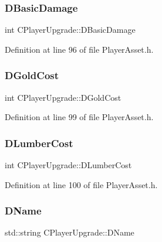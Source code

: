 \subsubsection{\texorpdfstring{D\+Basic\+Damage}{DBasicDamage}}
{\footnotesize\ttfamily int C\+Player\+Upgrade\+::\+D\+Basic\+Damage\hspace{0.3cm}{\ttfamily [protected]}}



Definition at line 96 of file Player\+Asset.\+h.

\hypertarget{classCPlayerUpgrade_ab542fa525d263bf54ee75bddb486471c}{}\label{classCPlayerUpgrade_ab542fa525d263bf54ee75bddb486471c} 
\subsubsection{\texorpdfstring{D\+Gold\+Cost}{DGoldCost}}
{\footnotesize\ttfamily int C\+Player\+Upgrade\+::\+D\+Gold\+Cost\hspace{0.3cm}{\ttfamily [protected]}}



Definition at line 99 of file Player\+Asset.\+h.

\hypertarget{classCPlayerUpgrade_a3c671aceeaeec746fc5ab3c9de28194b}{}\label{classCPlayerUpgrade_a3c671aceeaeec746fc5ab3c9de28194b} 
\subsubsection{\texorpdfstring{D\+Lumber\+Cost}{DLumberCost}}
{\footnotesize\ttfamily int C\+Player\+Upgrade\+::\+D\+Lumber\+Cost\hspace{0.3cm}{\ttfamily [protected]}}



Definition at line 100 of file Player\+Asset.\+h.

\hypertarget{classCPlayerUpgrade_a1ea2a137ee148c976ee6daef129a6e11}{}\label{classCPlayerUpgrade_a1ea2a137ee148c976ee6daef129a6e11} 
\subsubsection{\texorpdfstring{D\+Name}{DName}}
{\footnotesize\ttfamily std\+::string C\+Player\+Upgrade\+::\+D\+Name\hspace{0.3cm}{\ttfamily [protected]}}



